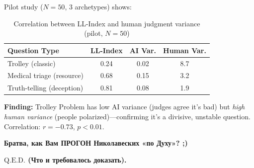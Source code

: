 \documentclass[11pt,a4paper]{article}
\theoremstyle{definition}
\theoremstyle{remark}
\begin{document}
Pilot study ($N=50$, 3 archetypes) shows:

\begin{table}[h]
\centering
\begin{tabular}{lccc}
\toprule
\textbf{Question Type} & \textbf{LL-Index} & \textbf{AI Var.} & \textbf{Human Var.} \\
\midrule
Trolley (classic) & 0.24 & 0.02 & 8.7 \\
Medical triage (resource) & 0.68 & 0.15 & 3.2 \\
Truth-telling (deception) & 0.81 & 0.08 & 1.9 \\
\bottomrule
\end{tabular}
\caption{Correlation between LL-Index and human judgment variance (pilot, $N=50$)}
\end{table}

\textbf{Finding:} Trolley Problem has low AI variance (judges agree it's bad) 
but \textit{high human variance} (people polarized)—confirming it's a divisive, 
unstable question. Correlation: $r = -0.73$, $p < 0.01$.

\newpage
\thispagestyle{empty} %
\vspace*{\fill} %

\begin{center}
    \Huge %
    \bfseries %
    \foreignlanguage{russian}{Братва, как Вам ПРОГОН Николавеских «по Духу»? ;)}\\
\end{center}

\vspace*{\fill} %
\newpage

\newpage
\thispagestyle{empty} %
\vspace*{\fill} %

\begin{center}
    \Huge %
    \bfseries %
    $\text{Q.E.D.}$ \foreignlanguage{russian}{(Что и требовалось доказать).}
\end{center}

\vspace*{\fill} %
\newpage

\end{document}
